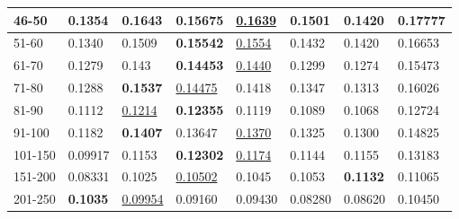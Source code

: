 \begin{table*}[]
\begin{tabular}{|l|l|l|l|l|l|l||l|}
        46-50       & 0.1354                         & \textbf{0.1643}                & 0.15675                        & \underline{0.1639}             & 0.1501                         & 0.1420                          & 0.17777                    \\ \hline
        51-60       & 0.1340                         & 0.1509                         & \textbf{0.15542}               & \underline{0.1554}             & 0.1432                         & 0.1420                          & 0.16653                    \\ \hline
        61-70       & 0.1279                         & 0.143                          & \textbf{0.14453}               & \underline{0.1440}             & 0.1299                         & 0.1274                          & 0.15473                    \\ \hline
        71-80       & 0.1288                         & \textbf{0.1537}                & \underline{0.14475}            & 0.1418                         & 0.1347                         & 0.1313                          & 0.16026                    \\ \hline
        81-90       & 0.1112                         & \underline{0.1214}             & \textbf{0.12355}               & 0.1119                         & 0.1089                         & 0.1068                          & 0.12724                    \\ \hline
        91-100      & 0.1182                         & \textbf{0.1407}                & 0.13647                        & \underline{0.1370}             & 0.1325                         & 0.1300                          & 0.14825                    \\ \hline
        101-150     & 0.09917                        & 0.1153                         & \textbf{0.12302}               & \underline{0.1174}             & 0.1144                         & 0.1155                          & 0.13183                    \\ \hline
        151-200     & 0.08331                        & 0.1025                         & \underline{0.10502}            & 0.1045                         & 0.1053                         & \textbf{0.1132}                 & 0.11065                    \\ \hline
        201-250     & \textbf{0.1035}                & \underline{0.09954}            & 0.09160                        & 0.09430                        & 0.08280                        & 0.08620                         & 0.10450                    \\ \hline

\end{tabular}
\end{table*}
